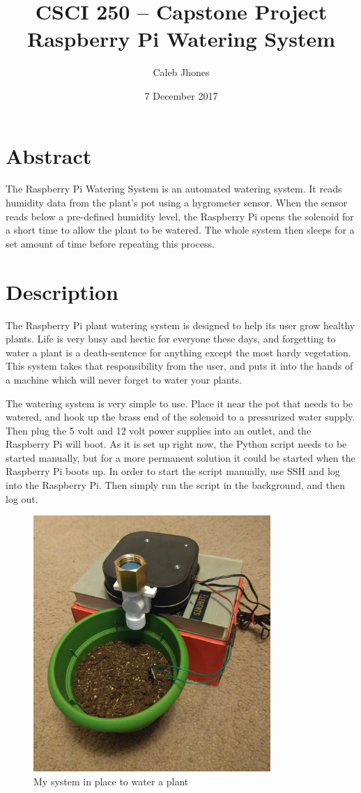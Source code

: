 \documentclass[11pt] {article}
\author{Caleb Jhones}
\date{7 December 2017}
\title{\Large{CSCI 250 -- Capstone Project} \\ \small{Raspberry Pi Watering System}}
\begin{document}
\maketitle

\section*{Abstract}
The Raspberry Pi Watering System is an automated watering system. It reads humidity data from the plant's pot using
a hygrometer sensor. When the sensor reads below a pre-defined humidity level, the Raspberry Pi opens the solenoid for
a short time to allow the plant to be watered. The whole system then sleeps for a set amount of time before repeating
this process.

\newpage

\section{Description}
The Raspberry Pi plant watering system is designed to help its user grow healthy plants. Life is very busy and hectic
for everyone these days, and forgetting to water a plant is a death-sentence for anything except the most hardy
vegetation. This system takes that responsibility from the user, and puts it into the hands of a machine which will
never forget to water your plants.

The watering system is very simple to use. Place it near the pot that needs to be watered, and hook up the brass end of
the solenoid to a pressurized water supply. Then plug the 5 volt and 12 volt power supplies into an outlet, and the
Raspberry Pi will boot. As it is set up right now, the Python script needs to be started manually, but for a more
permanent solution it could be started when the Raspberry Pi boots up. In order to start the script manually, use SSH
and log into the Raspberry Pi. Then simply run the script in the background, and then log out.

\begin{figure}[H]
    \begin{centering}
        \includegraphics[width=9cm]{../img/in-use}
        \caption{My system in place to water a plant}
    \end{centering}
    \label{in-place}
\end{figure}
\end{document}
